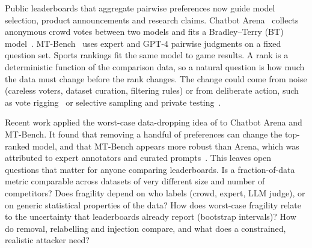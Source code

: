 \documentclass{article}
\begin{document}
Public leaderboards that aggregate pairwise preferences now guide model selection, product announcements and research claims. Chatbot Arena~\citep{chiang2024chatbot} collects anonymous crowd votes between two models and fits a Bradley--Terry (BT) model~\citep{bradley1952rank}. MT-Bench~\citep{zheng2023judging} uses expert and GPT-4 pairwise judgments on a fixed question set. Sports rankings fit the same model to game results. A rank is a deterministic function of the comparison data, so a natural question is how much the data must change before the rank changes. The change could come from noise (careless voters, dataset curation, filtering rules) or from deliberate action, such as vote rigging~\citep{min2025improving} or selective sampling and private testing~\citep{singh2025leaderboard}.

Recent work applied the worst-case data-dropping idea of \citet{broderick2020automatic} to Chatbot Arena and MT-Bench. It found that removing a handful of preferences can change the top-ranked model, and that MT-Bench appears more robust than Arena, which was attributed to expert annotators and curated prompts~\citep{huang2025dropping}. This leaves open questions that matter for anyone comparing leaderboards. Is a fraction-of-data metric comparable across datasets of very different size and number of competitors? Does fragility depend on who labels (crowd, expert, LLM judge), or on generic statistical properties of the data? How does worst-case fragility relate to the uncertainty that leaderboards already report (bootstrap intervals)? How do removal, relabelling and injection compare, and what does a constrained, realistic attacker need?
\end{document}
